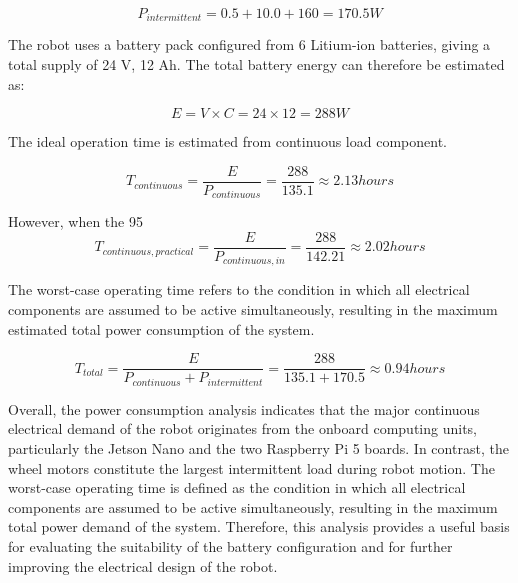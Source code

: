 \begin{equation*}
    P_{{intermittent}} = 0.5 + 10.0 + 160 = 170.5 W
\end{equation*}
    
The robot uses a battery pack configured from 6 Litium-ion batteries, giving a total supply of 24 V, 12 Ah. The total battery energy can therefore be estimated as:



\begin{equation*}
    E = V \times C = 24 \times 12 = 288 W
\end{equation*}

The ideal operation time is estimated from continuous load component.

\begin{equation*}
    T_{{continuous}} = \frac E {P_{{continuous}}} = \frac{288}{135.1} \approx 2.13 hours
\end{equation*}

However, when the 95%
\begin{equation*}
    T_{{continuous, practical}} = \frac E {P_{{continuous, in}}} = \frac{288}{142.21} \approx 2.02 hours
\end{equation*}

The worst-case operating time refers to the condition in which all electrical components are assumed to be active simultaneously, resulting in the maximum estimated total power consumption of the system.

\begin{equation*}
    T_{{total}} = \frac E {P_{{continuous}}+P_{{intermittent}}} = \frac{288}{135.1+170.5} \approx 0.94 hours
\end{equation*}

Overall, the power consumption analysis indicates that the major continuous electrical demand of the robot originates from the onboard computing units, particularly the Jetson Nano and the two Raspberry Pi 5 boards. In contrast, the wheel motors constitute the largest intermittent load during robot motion. The worst-case operating time is defined as the condition in which all electrical components are assumed to be active simultaneously, resulting in the maximum total power demand of the system. Therefore, this analysis provides a useful basis for evaluating the suitability of the battery configuration and for further improving the electrical design of the robot.

